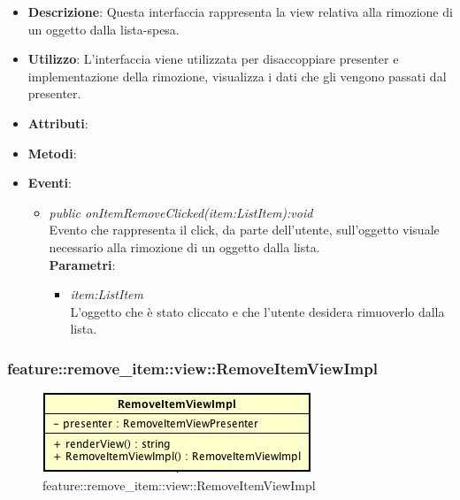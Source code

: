 \begin{itemize}
\item \textbf{Descrizione}: Questa interfaccia rappresenta la view relativa alla rimozione di un oggetto dalla lista-spesa.
\item \textbf{Utilizzo}: L'interfaccia viene utilizzata per disaccoppiare presenter e implementazione della rimozione, visualizza i dati che gli vengono passati dal presenter.
\item \textbf{Attributi}: 
\item \textbf{Metodi}:
\item \textbf{Eventi}:
	\begin{itemize}	
	\item \textit{public onItemRemoveClicked(item:ListItem):void}\\
	Evento che rappresenta il click, da parte dell'utente, sull'oggetto visuale necessario alla rimozione di un oggetto dalla lista.
			\\ \textbf{Parametri}: \begin{itemize}
			\item \textit{item:ListItem}\\
			L'oggetto che è stato cliccato e che l'utente desidera rimuoverlo dalla lista.
			\end{itemize} 
	\end{itemize}
\end{itemize}

\subsubsection{feature::remove\_item::view::RemoveItemViewImpl}

\label{feature::remove_item::view::RemoveItemViewImpl}
\begin{figure}[ht]
	\centering
	\includegraphics[scale=0.5]{Sezioni/SottosezioniST/img/app/RemoveItemViewImpl.png}
	\caption{feature::remove\_item::view::RemoveItemViewImpl}
\end{figure}

